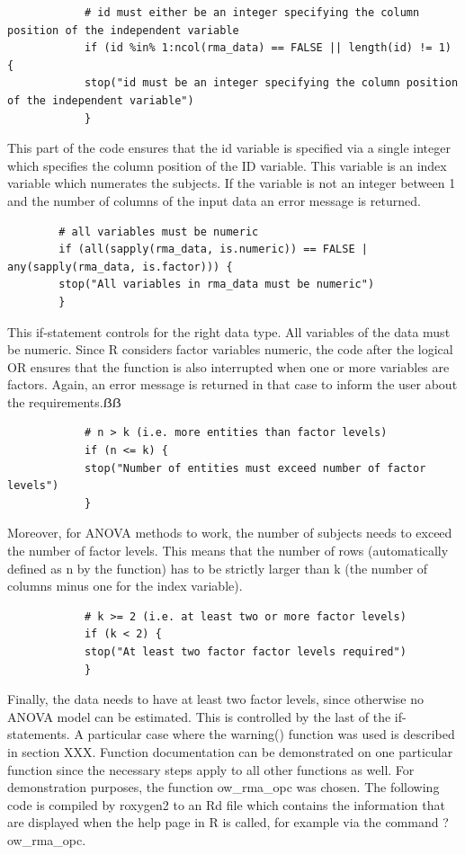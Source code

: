 \documentclass[11pt]{article}
\begin{document}
		\begin{lstlisting}
			# id must either be an integer specifying the column position of the independent variable
			if (id %in% 1:ncol(rma_data) == FALSE || length(id) != 1) {
			stop("id must be an integer specifying the column position of the independent variable")
			}
		\end{lstlisting}
		
		This part of the code ensures that the id variable is specified via a single integer which specifies the column position of the ID variable. This variable is an index variable which numerates the subjects. If the variable is not an integer between 1 and the number of columns of the input data an error message is returned.\\
		
		\begin{lstlisting}
		# all variables must be numeric
		if (all(sapply(rma_data, is.numeric)) == FALSE | any(sapply(rma_data, is.factor))) {
		stop("All variables in rma_data must be numeric")
		}
		\end{lstlisting}
		
		This if-statement controls for the right data type. All variables of the data must be numeric. Since R considers factor variables numeric, the code after the logical OR ensures that the function is also interrupted when one or more variables are factors. Again, an error message is returned in that case to inform the user about the requirements.ẞẞ
		
		\begin{lstlisting}
			# n > k (i.e. more entities than factor levels)
			if (n <= k) {
			stop("Number of entities must exceed number of factor levels")
			}
		\end{lstlisting}
		
		Moreover, for ANOVA methods to work, the number of subjects needs to exceed the number of factor levels. This means that the number of rows (automatically defined as n by the function) has to be strictly larger than k (the number of columns minus one for the index variable).\\
		
		\begin{lstlisting}
		    # k >= 2 (i.e. at least two or more factor levels)
		    if (k < 2) {
		    stop("At least two factor factor levels required")
		    }  
		\end{lstlisting}
		
		Finally, the data needs to have at least two factor levels, since otherwise no ANOVA model can be estimated. This is controlled by the last of the if-statements.
		A particular case where the warning() function was used is described in section XXX.
		Function documentation can be demonstrated on one particular function since the necessary steps apply to all other functions as well. For demonstration purposes, the function ow\_rma\_opc was chosen. The following code is compiled by roxygen2 to an Rd file which contains the information that are displayed when the help page in R is called, for example via the command ?ow\_rma\_opc.\\
		
\end{document}
